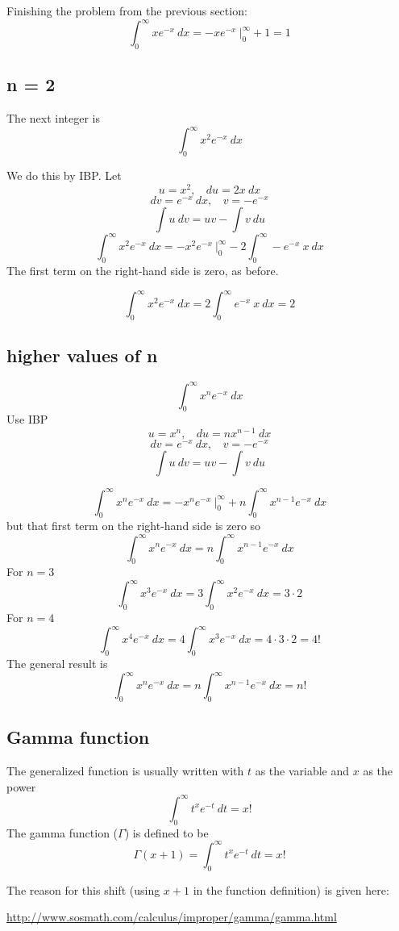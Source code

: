 \documentclass[11pt, oneside]{article}
\begin{document}
Finishing the problem from the previous section:
\[ \int_0^{\infty} x e^{-x} \ dx = - x e^{-x} \ \bigg |_0^{\infty} +  1 = 1  \]

\subsection*{n = 2}
The next integer is
\[ \int_0^{\infty} x^2 e^{-x} \ dx \]

We do this by IBP.  Let
\[ u = x^2, \ \ \ \ du = 2x \ dx \]
\[ dv = e^{-x} \ dx, \ \ \ \ v = - e^{-x} \]
\[ \int u \ dv = uv - \int v \ du \]
\[ \int_0^{\infty} x^2 e^{-x} \ dx = - x^2 e^{-x} \ \bigg |_0^{\infty} - 2 \int_0^{\infty} - e^{-x} \ x \ dx \]
The first term on the right-hand side is zero, as before.  

\[ \int_0^{\infty} x^2 e^{-x} \ dx =  2 \int_0^{\infty} e^{-x} \ x \ dx = 2 \]

\subsection*{higher values of n}
\[ \int_0^{\infty} x^n e^{-x} \ dx \]
Use IBP
\[ u = x^n, \ \ \ \ du = nx^{n-1}\ dx \]
\[ dv = e^{-x} \ dx, \ \ \ \ v = - e^{-x} \]
\[ \int u \ dv = uv - \int v \ du \]

\[ \int_0^{\infty} x^n e^{-x} \ dx = - x^n e^{-x} \ \bigg |_0^{\infty} + n \int_0^{\infty} x^{n-1} e^{-x} \ dx\]
but that first term on the right-hand side is zero so
\[ \int_0^{\infty} x^n e^{-x} \ dx = n \int_0^{\infty} x^{n-1} e^{-x} \ dx\]
For $n=3$
\[ \int_0^{\infty} x^3 e^{-x} \ dx = 3 \int_0^{\infty} x^{2} e^{-x} \ dx = 3 \cdot 2 \]
For $n=4$
\[ \int_0^{\infty} x^4 e^{-x} \ dx = 4 \int_0^{\infty} x^{3} e^{-x} \ dx = 4 \cdot 3 \cdot 2 = 4! \]
The general result is
\[ \int _0^{\infty}x^n e^{-x} \ dx =  n \int_0^{\infty} x^{n-1} e^{-x} \ dx = n! \]

\subsection*{Gamma function}
The generalized function is usually written with $t$ as the variable and $x$ as the power
\[ \int_0^{\infty} t^x e^{-t} \ dt = x!  \]
The gamma function ($\Gamma$) is defined to be
\[ \Gamma(x + 1) = \int_0^{\infty} t^x e^{-t} \ dt = x! \]

The reason for this shift (using $x + 1$ in the function definition) is given here:

\url{http://www.sosmath.com/calculus/improper/gamma/gamma.html}
\end{document}

